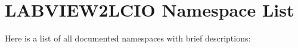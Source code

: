 \section{LABVIEW2LCIO Namespace List}
Here is a list of all documented namespaces with brief descriptions:\begin{CompactList}
\item{}
\item{}
\item{}
\end{CompactList}
